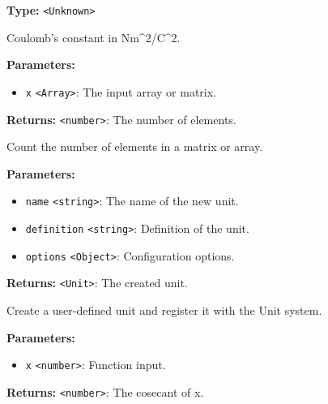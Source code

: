 \documentclass[12pt,a4paper]{article}
\begin{document}
\noindent \textbf{Type:} \texttt{<Unknown>}

\noindent Coulomb's constant in Nm\textasciicircum{}2/C\textasciicircum{}2.

\vspace{5mm}
\noindent {}


\noindent \textbf{Parameters:}
\begin{itemize}
  \item \texttt{x} \texttt{<Array>}: The input array or matrix.
\end{itemize}

\noindent \textbf{Returns:} \texttt{<number>}: The number of elements.

\noindent Count the number of elements in a matrix or array.

\vspace{5mm}
\noindent {}


\noindent \textbf{Parameters:}
\begin{itemize}
  \item \texttt{name} \texttt{<string>}: The name of the new unit.
  \item \texttt{definition} \texttt{<string>}: Definition of the unit.
  \item \texttt{options} \texttt{<Object>}: Configuration options.
\end{itemize}

\noindent \textbf{Returns:} \texttt{<Unit>}: The created unit.

\noindent Create a user-defined unit and register it with the Unit system.

\vspace{5mm}
\noindent {}


\noindent \textbf{Parameters:}
\begin{itemize}
  \item \texttt{x} \texttt{<number>}: Function input.
\end{itemize}

\noindent \textbf{Returns:} \texttt{<number>}: The cosecant of x.
\end{document}
